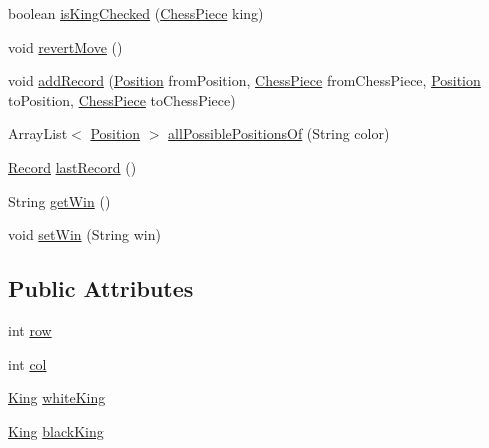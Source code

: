 \begin{DoxyCompactItemize}
\item 
boolean \hyperlink{classmodel_core_1_1_chess_board_a031a84fd458cb11464d0eadc6317b945}{is\+King\+Checked} (\hyperlink{classmodel_chess_pieces_1_1_chess_piece}{Chess\+Piece} king)
\item 
void \hyperlink{classmodel_core_1_1_chess_board_ad1bf119fff1c4af0b315c00ccec4c40b}{revert\+Move} ()
\item 
void \hyperlink{classmodel_core_1_1_chess_board_af36430e89b73d56b322509621d8b27ee}{add\+Record} (\hyperlink{classmodel_core_1_1_position}{Position} from\+Position, \hyperlink{classmodel_chess_pieces_1_1_chess_piece}{Chess\+Piece} from\+Chess\+Piece, \hyperlink{classmodel_core_1_1_position}{Position} to\+Position, \hyperlink{classmodel_chess_pieces_1_1_chess_piece}{Chess\+Piece} to\+Chess\+Piece)
\item 
Array\+List$<$ \hyperlink{classmodel_core_1_1_position}{Position} $>$ \hyperlink{classmodel_core_1_1_chess_board_a9580196da2802e440d64b5d6f8d50bf1}{all\+Possible\+Positions\+Of} (String color)
\item 
\hyperlink{classmodel_core_1_1_record}{Record} \hyperlink{classmodel_core_1_1_chess_board_ae899ac8bc62aaf23e4724870932ac6bf}{last\+Record} ()
\item 
String \hyperlink{classmodel_core_1_1_chess_board_a34e37f076c55fdc46d66ac2dc0280267}{get\+Win} ()
\item 
void \hyperlink{classmodel_core_1_1_chess_board_a504f3ee56db184a7e2d8a0aa0b4da1a5}{set\+Win} (String win)
\end{DoxyCompactItemize}
\subsection*{Public Attributes}
\begin{DoxyCompactItemize}
\item 
int \hyperlink{classmodel_core_1_1_chess_board_a97b8b44a011e141557812f801be59fb3}{row}
\item 
int \hyperlink{classmodel_core_1_1_chess_board_ad7110bd9ee10396094cb5a58406bd04e}{col}
\item 
\hyperlink{classmodel_chess_pieces_1_1_king}{King} \hyperlink{classmodel_core_1_1_chess_board_ac35268604f4e0b6c5b0b1a454f71f6b6}{white\+King}
\item 
\hyperlink{classmodel_chess_pieces_1_1_king}{King} \hyperlink{classmodel_core_1_1_chess_board_a4a811ce68180a71f5fea55095c3ef0f5}{black\+King}
\end{DoxyCompactItemize}


